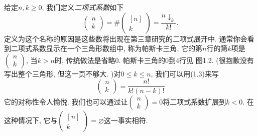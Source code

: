 \documentclass{ctexbook}
\begin{document}
给定$n, k \geqslant 0$, 我们定义\textsl{二项式系数}如下
\begin{equation}
\left(\begin{array}{l}
n \\ k
\end{array}\right)=\#\left(\begin{array}{c}
{[n]} \\ k
\end{array}\right)=\frac{n \downarrow_{k}}{k !}.
\end{equation}
定义为这个名称的原因是这些数将出现在第三章研究的二项式展开中. 通常你会看到二项式系数显示在一个三角形数组中, 称为帕斯卡三角,
它的第$n$行的第$k$项是$\left(\begin{array}{l}n \\ k\end{array}\right)$, 当$k>n$时, 传统做法是省略0. 帕斯卡三角的0到4行见
图1.2. (很抱歉没有写出整个三角形, 但这一页不够大. )对$0 \leqslant k \leqslant n$, 我们可以用(1.3)来写
\begin{equation}
    \left(\begin{array}{l}
        n \\ k
        \end{array}\right)=\frac{n !}{k !(n-k) !}
\end{equation}
它的对称性令人愉悦. 我们也可以通过让$\left(\begin{array}{l}n \\ k\end{array}\right)=0$将二项式系数扩展到$k<0$. 在这种情况下,
它与$\left(\begin{array}{c}{[n]} \\ k\end{array}\right)=\varnothing$这一事实相符.
\end{document}

